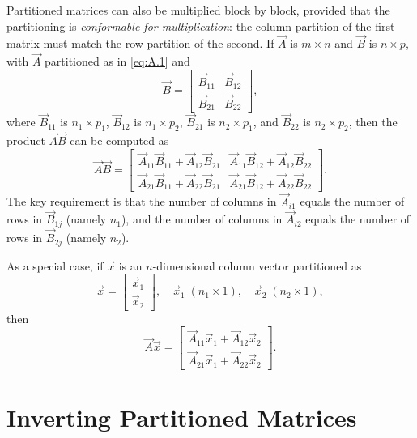 Partitioned matrices can also be multiplied block by block, provided that
the partitioning is \emph{conformable for multiplication}: the column
partition of the first matrix must match the row partition of the second.
If $\vec{A}$ is $m \times n$ and $\vec{B}$ is $n \times p$, with $\vec{A}$
partitioned as in \eqref{eq:A.1} and
\begin{equation}
  \vec{B} =
  \begin{bmatrix}
    \vec{B}_{11} & \vec{B}_{12} \\
    \vec{B}_{21} & \vec{B}_{22}
  \end{bmatrix},
  \label{eq:A.3}
\end{equation}
where $\vec{B}_{11}$ is $n_1 \times p_1$, $\vec{B}_{12}$ is
$n_1 \times p_2$, $\vec{B}_{21}$ is $n_2 \times p_1$, and
$\vec{B}_{22}$ is $n_2 \times p_2$, then the product $\vec{A}\vec{B}$
can be computed as
\begin{equation}
  \vec{A}\vec{B} =
  \begin{bmatrix}
    \vec{A}_{11}\vec{B}_{11} + \vec{A}_{12}\vec{B}_{21} &
      \vec{A}_{11}\vec{B}_{12} + \vec{A}_{12}\vec{B}_{22} \\
    \vec{A}_{21}\vec{B}_{11} + \vec{A}_{22}\vec{B}_{21} &
      \vec{A}_{21}\vec{B}_{12} + \vec{A}_{22}\vec{B}_{22}
  \end{bmatrix}.
  \label{eq:A.4}
\end{equation}
The key requirement is that the number of columns in $\vec{A}_{i1}$
equals the number of rows in $\vec{B}_{1j}$ (namely $n_1$), and the
number of columns in $\vec{A}_{i2}$ equals the number of rows in
$\vec{B}_{2j}$ (namely $n_2$).

As a special case, if $\vec{x}$ is an $n$-dimensional column vector
partitioned as
\[
  \vec{x} =
  \begin{bmatrix}
    \vec{x}_1 \\ \vec{x}_2
  \end{bmatrix},
  \quad
  \vec{x}_1 \; (n_1 \times 1), \quad
  \vec{x}_2 \; (n_2 \times 1),
\]
then
\begin{equation}
  \vec{A}\vec{x} =
  \begin{bmatrix}
    \vec{A}_{11}\vec{x}_1 + \vec{A}_{12}\vec{x}_2 \\
    \vec{A}_{21}\vec{x}_1 + \vec{A}_{22}\vec{x}_2
  \end{bmatrix}.
  \label{eq:A.5}
\end{equation}

\section{Inverting Partitioned Matrices}
\label{sec:A.2}

